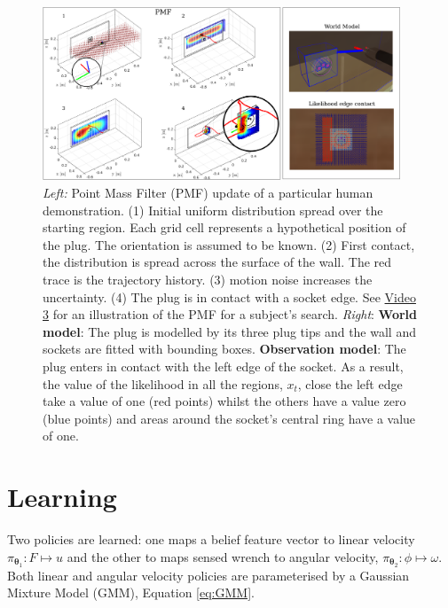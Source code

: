 \documentclass[final,5p,times,twocolumn]{elsarticle}
\newcommand{\Param}{\boldsymbol{\theta}}
\begin{document}
\begin{figure}
 \centering
   \includegraphics[width=0.95\textwidth]{./Figure/Figure2.pdf}
   \caption{\textit{Left:} Point Mass Filter (PMF) update of a particular human demonstration. (1) Initial uniform distribution spread over the starting 
   region. Each grid cell represents a hypothetical position of the plug. The orientation is assumed to be known. (2) First contact, the distribution 
   is spread across the surface of the wall. The red trace is the trajectory history. (3) motion noise increases the uncertainty. (4) The plug is in contact with a socket edge.
   See \href{http://lasa.epfl.ch/videos/gpldecha/pih-search/subject_PMF_belief_location.wmv}{Video 3} for an illustration of the PMF for a subject's search.
   \textit{Right}: \textbf{World model}: The plug is modelled by its three plug tips and the wall and sockets are fitted with bounding boxes.
   \textbf{Observation model}: The plug enters in contact with the left edge of the socket. As a result, the value of the likelihood in all the regions, $x_t$, close the left edge take 
   a value of one (red points)  whilst the others have a value zero (blue points) and areas around the socket's central 
   ring have a value of one. }
  \label{fig:PMF}
\end{figure}




\section{Learning}\label{sec:learning-value-actor}

Two policies are learned: one maps a belief feature vector 
to linear velocity $\pi_{\Param_1} : F \mapsto u$ and the other to maps sensed wrench to angular 
velocity, $ \pi_{\Param_2} : \phi \mapsto \omega$.  Both linear and angular velocity policies are 
parameterised by a Gaussian Mixture Model (GMM), Equation \ref{eq:GMM}.
\end{document}
